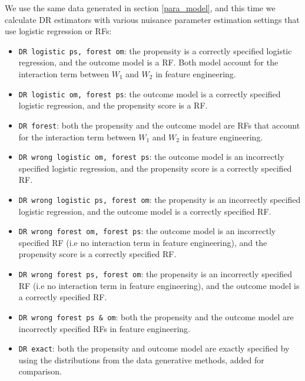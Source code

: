 \documentclass[12pt,twoside]{article}
\begin{document}
We use the same data generated in section \ref{para_model}, and this time we calculate DR estimators with various nuisance parameter estimation settings that use logistic regression or RFs:
\begin{itemize}
    \item \texttt{DR logistic ps, forest om}: the propensity is a correctly specified logistic regression, and the outcome model is a RF. Both model account for the interaction term between $W_1$ and $W_2$ in feature engineering.
    \item \texttt{DR logistic om, forest ps}: the outcome model is a correctly specified logistic regression, and the propensity score is a RF.
    \item \texttt{DR forest}: both the propensity and the outcome model are RFs that account for the interaction term between $W_1$ and $W_2$ in feature engineering.
    \item \texttt{DR wrong logistic om, forest ps}: the outcome model is an incorrectly specified logistic regression, and the propensity score is a correctly specified RF.
    \item \texttt{DR wrong logistic ps, forest om}: the propensity is an incorrectly specified logistic regression, and the outcome model is a correctly specified RF.
    \item \texttt{DR wrong forest om, forest ps}: the outcome model is an incorrectly specified RF (i.e no interaction term in feature engineering), and the propensity score is a correctly specified RF.
    \item \texttt{DR wrong forest ps, forest om}: the propensity is an incorrectly specified RF (i.e no interaction term in feature engineering), and the outcome model is a correctly specified RF.
    \item \texttt{DR wrong forest ps \& om}: both the propensity and the outcome model are incorrectly specified RFs in feature engineering.
    \item \texttt{DR exact}: both the propensity and outcome model are exactly specified by using the distributions from the data generative methods, added for comparison.
\end{itemize}
\end{document}
